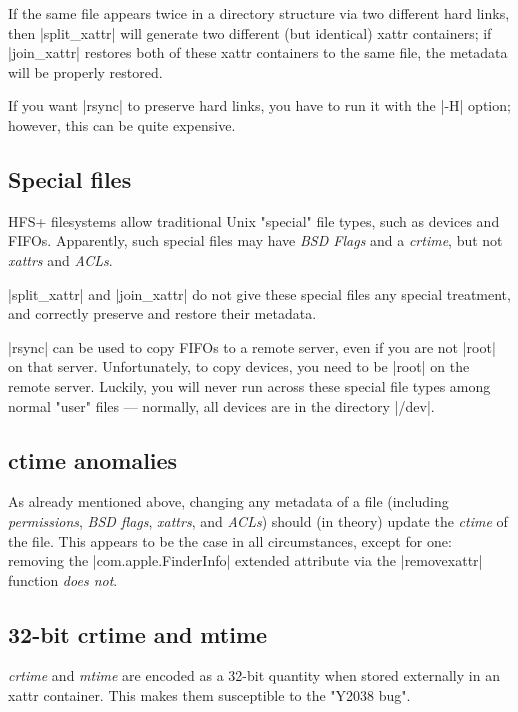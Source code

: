 \documentclass[11pt]{article}
\begin{document}
If the same file appears twice in a directory
structure via two different hard links, then |split_xattr|
will generate two different (but identical) xattr containers;
if |join_xattr| restores both of these xattr containers
to the same file, the metadata will be properly restored.

If you want |rsync| to preserve hard links, you have to run it
with the |-H| option; however, this can be quite expensive.



\subsection{Special files}

HFS+ filesystems allow traditional Unix "special" file types,
such as devices and FIFOs.
Apparently, such special files may have \emph{BSD Flags}
and a \emph{crtime}, but not \emph{xattrs} and \emph{ACLs}.

|split_xattr| and |join_xattr| do not give these special files
any special treatment, and correctly preserve and restore
their metadata.

|rsync| can be used to copy FIFOs to a remote server,
even if you are not |root| on that server.
Unfortunately, to copy devices, you need to be |root|
on the remote server.
Luckily, you will never run across these special file types
among normal "user" files --- normally, all devices are in
the directory |/dev|.




\subsection{ctime anomalies}

As already mentioned above, changing any metadata of a file 
(including \emph{permissions}, \emph{BSD flags}, \emph{xattrs},
and \emph{ACLs}) 
should (in theory) update the \emph{ctime} of the file.  This
appears to be the case in all circumstances, except for one: removing the
|com.apple.FinderInfo| extended attribute via the |removexattr| 
function \emph{does not}.


\subsection{32-bit crtime and mtime}

\emph{crtime} and \emph{mtime} are encoded 
as a 32-bit quantity when stored externally in an xattr
container.  This makes them susceptible to the "Y2038 bug".  
\end{document}
